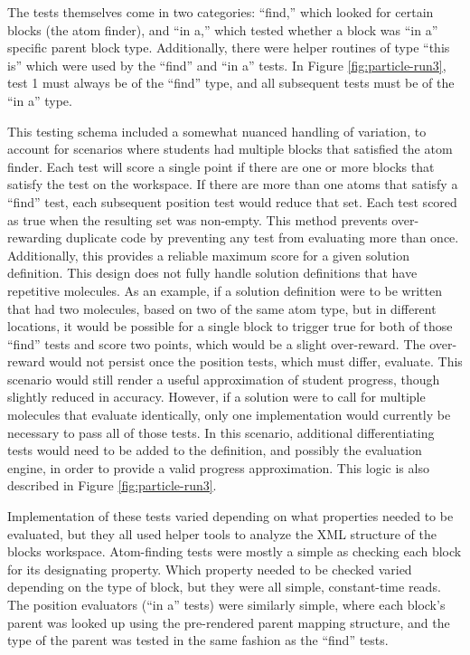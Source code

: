 The tests themselves come in two categories: ``find,'' which looked for certain blocks (the atom finder), and ``in a,'' which tested whether a block was ``in a'' specific parent block type. Additionally, there were helper routines of type ``this is'' which were used by the ``find'' and ``in a'' tests. In Figure \ref{fig:particle-run3}, test 1 must always be of the ``find'' type, and all subsequent tests must be of the ``in a'' type. 

This testing schema included a somewhat nuanced handling of variation, to account for scenarios where students had multiple blocks that satisfied the atom finder. Each test will score a single point if there are one or more blocks that satisfy the test on the workspace. If there are more than one atoms that satisfy a ``find'' test, each subsequent position test would reduce that set. Each test scored as true when the resulting set was non-empty. This method prevents over-rewarding duplicate code by preventing any test from evaluating more than once. Additionally, this provides a reliable maximum score for a given solution definition. This design does not fully handle solution definitions that have repetitive molecules. As an example, if a solution definition were to be written that had two molecules, based on two of the same atom type, but in different locations, it would be possible for a single block to trigger true for both of those ``find'' tests and score two points, which would be a slight over-reward. The over-reward would not persist once the position tests, which must differ, evaluate. This scenario would still render a useful approximation of student progress, though slightly reduced in accuracy. However, if a solution were to call for multiple molecules that evaluate identically, only one implementation would currently be necessary to pass all of those tests. In this scenario, additional differentiating tests would need to be added to the definition, and possibly the evaluation engine, in order to provide a valid progress approximation. 
This logic is also described in Figure \ref{fig:particle-run3}. 

Implementation of these tests varied depending on what properties needed to be evaluated, but they all used helper tools to analyze the XML structure of the blocks workspace. Atom-finding tests were mostly a simple as checking each block for its designating property. Which property needed to be checked varied depending on the type of block, but they were all simple, constant-time reads. The position evaluators (``in a'' tests) were similarly simple, where each block's parent was looked up using the pre-rendered parent mapping structure, and the type of the parent was tested in the same fashion as the ``find'' tests. 


